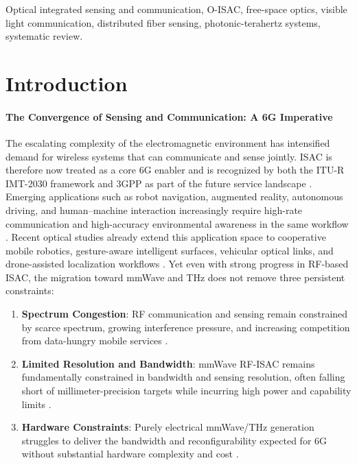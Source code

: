 \documentclass[letterpaper,journal]{IEEEtran}
\begin{document}
\begin{IEEEkeywords}
    Optical integrated sensing and communication, O-ISAC, free-space optics, visible light communication, distributed fiber sensing, photonic-terahertz systems, systematic review.
\end{IEEEkeywords}

\section{Introduction}
\label{introduction}
\paragraph{The Convergence of Sensing and Communication: A 6G Imperative}
The escalating complexity of the electromagnetic environment has intensified demand for wireless systems that can communicate and sense jointly. ISAC is therefore now treated as a core 6G enabler and is recognized by both the ITU-R IMT-2030 framework and 3GPP as part of the future service landscape \cite{O_ISAC_070,O_ISAC_162}. Emerging applications such as robot navigation, augmented reality, autonomous driving, and human--machine interaction increasingly require high-rate communication and high-accuracy environmental awareness in the same workflow \cite{O_ISAC_016,O_ISAC_351}. Recent optical studies already extend this application space to cooperative mobile robotics, gesture-aware intelligent surfaces, vehicular optical links, and drone-assisted localization workflows \cite{O_ISAC_084,O_ISAC_123,O_ISAC_129,O_ISAC_143}. Yet even with strong progress in RF-based ISAC, the migration toward mmWave and THz does not remove three persistent constraints:

\begin{enumerate}
    \item \textbf{Spectrum Congestion}: RF communication and sensing remain constrained by scarce spectrum, growing interference pressure, and increasing competition from data-hungry mobile services \cite{O_ISAC_068,O_ISAC_161}.
    \item \textbf{Limited Resolution and Bandwidth}: mmWave RF-ISAC remains fundamentally constrained in bandwidth and sensing resolution, often falling short of millimeter-precision targets while incurring high power and capability limits \cite{O_ISAC_021,O_ISAC_203}.
    \item \textbf{Hardware Constraints}: Purely electrical mmWave/THz generation struggles to deliver the bandwidth and reconfigurability expected for 6G without substantial hardware complexity and cost \cite{O_ISAC_070,O_ISAC_286}.
\end{enumerate}
\end{document}
